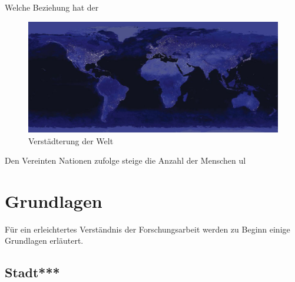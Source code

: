 \documentclass{scrartcl}
\begin{document}
Welche Beziehung hat der 
\begin{figure}[htbp]
\centering
\includegraphics[width=14cm]{image_folder/sattelit_bild_welt.png}
\caption{Verstädterung der Welt}
\end{figure}

Den Vereinten Nationen zufolge steige die Anzahl der Menschen \acs{ul}





\section{Grundlagen}

Für ein erleichtertes Verständnis der Forschungsarbeit werden zu Beginn einige Grundlagen erläutert.

\subsection{Stadt***}
\end{document}
